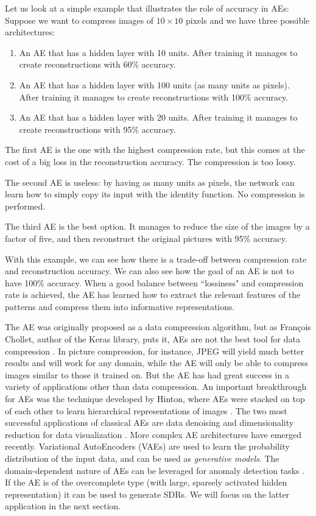 \documentclass[runningheads]{llncs}
\begin{document}
Let us look at a simple example that illustrates the role of accuracy in AEs: Suppose we want to compress images of $10 \times 10$ pixels and we have three possible architectures:
\begin{enumerate}
    \item An AE that has a hidden layer with 10 units. After training it manages to create reconstructions with 60\% accuracy.
    \item An AE that has a hidden layer with 100 units (as many units as pixels). After training it manages to create reconstructions with 100\% accuracy.
    \item An AE that has a hidden layer with 20 units. After training it manages to create reconstructions with 95\% accuracy.
\end{enumerate}

The first AE is the one with the highest compression rate, but this comes at the cost of a big loss in the reconstruction accuracy. The compression is too lossy.

The second AE is useless: by having as many units as pixels, the network can learn how to simply copy its input with the identity function. No compression is performed.

The third AE is the best option. It manages to reduce the size of the images by a factor of five, and then reconstruct the original pictures with 95\% accuracy.

With this example, we can see how there is a trade-off between compression rate and reconstruction accuracy. We can also see how the goal of an AE is not to have 100\% accuracy. When a good balance between ``lossiness" and compression rate is achieved, the AE has learned how to extract the relevant features of the patterns and compress them into informative representations.
\newline

The AE was originally proposed as a data compression algorithm, but as François Chollet, author of the Keras library, puts it, AEs are not the best tool for data compression \cite{chollet2016building}. In picture compression, for instance, JPEG will yield much better results and will work for any domain, while the AE will only be able to compress images similar to those it trained on.
But the AE has had great success in a variety of applications other than data compression.
An important breakthrough for AEs was the technique developed by Hinton, where AEs were stacked on top of each other to learn hierarchical representations of images \cite{krizhevsky2011using}.
The two most successful applications of classical AEs are data denoising \cite{cho2013simple}  and dimensionality reduction for data visualization \cite{hinton2006reducing}.
More complex AE architectures have emerged recently. Variational AutoEncoders (VAEs) \cite{kingma2013auto} are used to learn the probability distribution of the input data, and can be used as \textit{generative models}. The domain-dependent nature of AEs can be leveraged for anomaly detection tasks \cite{an2015variational,sakurada2014anomaly}. If the AE is of the overcomplete type (with large, sparsely activated hidden representation) it can be used to generate SDRs. We will focus on the latter application in the next section.
\end{document}
